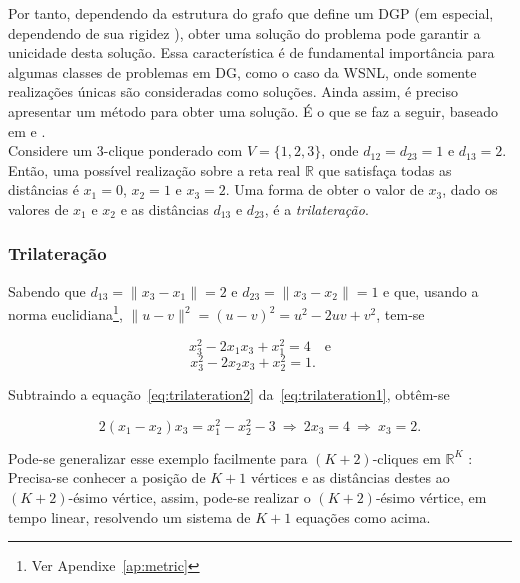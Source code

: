 Por tanto, dependendo da estrutura do grafo que define um DGP (em especial, dependendo de sua rigidez \cite{eren2004rigidity, alfakihEuclideanDistanceMatricesApplicationsRigidity}), obter uma solução do problema pode garantir a unicidade desta solução. Essa característica é de fundamental importância para algumas classes de problemas em DG, como o caso da WSNL, onde somente realizações únicas são consideradas como soluções. Ainda assim, é preciso apresentar um método para obter uma solução.  É o que se faz a seguir, baseado em \cite{libertiEDG} e \cite{trilaterationDong}. 
\\

Considere um 3-clique ponderado com $V = \{1,2,3\}$, onde $d_{12} = d_{23} = 1$ e $d_{13} = 2$. Então, uma possível realização sobre a reta real $\mathbb{R}$ que satisfaça todas as distâncias é $x_1 = 0$, $x_2 = 1$ e $x_3 = 2$. Uma forma de obter o valor de $x_3$, dado os valores de $x_1$ e $x_2$ e as distâncias $d_{13}$ e $d_{23}$, é a \textit{trilateração}.

\subsubsection{Trilateração}

 Sabendo que $d_{13} = \lVert x_3 - x_1\rVert = 2$ e $d_{23} = \lVert x_3 - x_2 \rVert = 1$ e que, usando a norma euclidiana\footnote{Ver Apendixe~\ref{ap:metric}}, $\lVert u-v\rVert^2 = (u-v)^2 = u^2 -2uv + v^2$, tem-se

\begin{equation}
	x_3^2 - 2x_1x_3 +x_1^2 = 4 \quad \textrm{e}
	\label{eq:trilateration1}
\end{equation}
\begin{equation}
x_3^2 - 2x_2x_3 +x_2^2 = 1. \quad
\label{eq:trilateration2}
\end{equation}

Subtraindo a equação~\ref{eq:trilateration2} da~\ref{eq:trilateration1}, obtêm-se

\begin{equation*}
	2(x_1-x_2)x_3 = x_1^2 - x_2^2 - 3 \ \Rightarrow \ 2x_3 = 4 \ \Rightarrow \ x_3 = 2.
\end{equation*}

Pode-se generalizar esse exemplo facilmente para $(K+2)$-cliques em $\mathbb{R}^{K}$ \cite{libertiEDG}: Precisa-se conhecer a posição de $K+1$ vértices e as distâncias destes ao $(K+2)$-ésimo vértice, assim, pode-se realizar o $(K+2)$-ésimo vértice, em tempo linear, resolvendo um sistema de $K+1$ equações como acima.
\\

